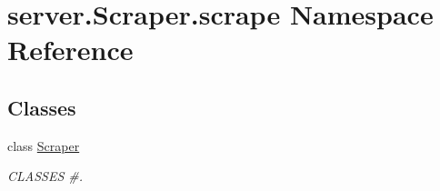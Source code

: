 \hypertarget{namespaceserver_1_1_scraper_1_1scrape}{}\section{server.\+Scraper.\+scrape Namespace Reference}
\label{namespaceserver_1_1_scraper_1_1scrape}
\subsection*{Classes}
\begin{DoxyCompactItemize}
\item 
class \mbox{\hyperlink{classserver_1_1_scraper_1_1scrape_1_1_scraper}{Scraper}}
\begin{DoxyCompactList}\small\item\em C\+L\+A\+S\+S\+ES \#. \end{DoxyCompactList}\end{DoxyCompactItemize}
